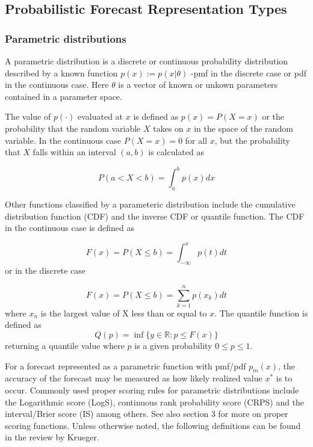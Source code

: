 \documentclass[11pt,notitlepage]{isuthesis}
\begin{document}
\subsection{Probabilistic Forecast Representation Types}
\subsubsection{Parametric distributions}
\label{section:pardist}
A parametric distribution is a discrete or continuous probability distribution 
described by a known function $p(x) := p(x|\theta)$ -pmf in the discrete case or 
pdf in the continuous case. Here $\theta$ is a vector of known or unkown 
parameters 
contained in a parameter space. 

The value of $p(\cdot)$ evaluated at $x$ is defined as 
$p(x) = P(X = x)$ or the probability that the random variable $X$ takes
on $x$ in the space of the random variable. In the continuous case 
$P(X = x) = 0$ for all $x$, but the probability 
that $X$ falls within an interval $(a,b)$ is calculated as

\begin{equation}
\label{eq:prob}
  P(a < X < b) = \int_a^b p(x) dx
\end{equation}

Other functions classified by a parameteric distribution include the cumulative
distribution function (CDF) and the inverse CDF or quantile function. The CDF 
in the continuous case is defined as

\begin{equation}
\label{eq:ccdf}
  F(x) = P(X \leq b) = \int_{-\infty}^x p(t) dt
\end{equation}
or in the discrete case 

\begin{equation}
\label{eq:dcdf}
  F(x) = P(X \leq b) = \sum_{k=1}^n p(x_k) dt
\end{equation}
where $x_n$ is the largest value of X less than or equal to $x$.
The quantile function is defined as
\begin{equation}
\label{eq:quant}
  Q(p) = \inf \{ y \in \mathbb{R} : p \leq F(x) \}
\end{equation}
returning a quantile value where $p$ is a given probability $0\leq p \leq 1$.

For a forecast represented as a parametric function with pmf/pdf $p_m(x)$, 
the accuracy of the forecast may be measured as how likely realized value $x^*$
is to occur. Commonly used proper scoring rules for parametric distributions
include the Logarithmic score (LogS), 
continuous rank probability score (CRPS) \cite{hersbach2000decomposition}
\cite{alves2013ncep} and the interval/Brier 
score (IS) \cite{gneiting2007strictly} among 
others. See also \cite{gneiting2014probabilistic}
section 3 for more on proper scoring functions. Unless otherwise noted, the 
following
definitions can be found in the review by Krueger.
\end{document}
